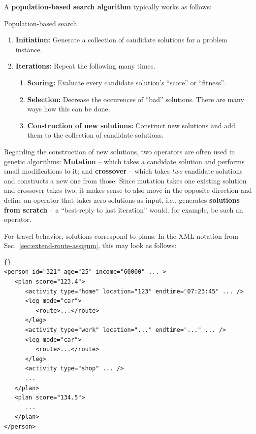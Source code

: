 A \textbf{population-based search algorithm} typically works as
follows:
\begin{algorithm}[H]

\caption{Population-based search}

\begin{enumerate}

\item \textbf{Initiation:} Generate a collection of candidate
  solutions for a problem instance.

\item \textbf{Iterations:} Repeat the following many times.

\begin{enumerate}

\item \textbf{Scoring:} Evaluate every candidate solution's ``score''
  or ``fitness''.

\item \textbf{Selection:} Decrease the occurences of ``bad''
  solutions.  There are many ways how this can be done.

\item \textbf{Construction of new solutions:} Construct new solutions
  and add them to the collection of candidate solutions.

\end{enumerate}

\end{enumerate}

\end{algorithm}

Regarding the construction of new solutions, two operators are often
used in genetic algorithms: \textbf{Mutation} -- which takes a
candidate solution and performs small modifications to it; and
\textbf{crossover} -- which takes \emph{two} candidate solutions and
constructs a new one from those.  Since mutation takes one existing
solution and crossover takes two, it makes sense to also move in the
opposite direction and define an operator that takes zero solutions as
input, i.e., generates \textbf{solutions from scratch} -- a
``best-reply to last iteration'' would, for example, be such an
operator.

For travel behavior, solutions correspond to plans.
In the XML notation from Sec.~\ref{sec:extend-route-assignm}, 
this may look as follows:
\begin{lstlisting}{}
<person id="321" age="25" income="60000" ... >
   <plan score="123.4">
      <activity type="home" location="123" endtime="07:23:45" ... />
      <leg mode="car">
         <route>...</route>
      </leg>
      <activity type="work" location="..." endtime="..." ... />
      <leg mode="car">
         <route>...</route>
      </leg>
      <activity type="shop" ... />
      ...
   </plan>
   <plan score="134.5">
      ...
   </plan>
</person>
\end{lstlisting}

